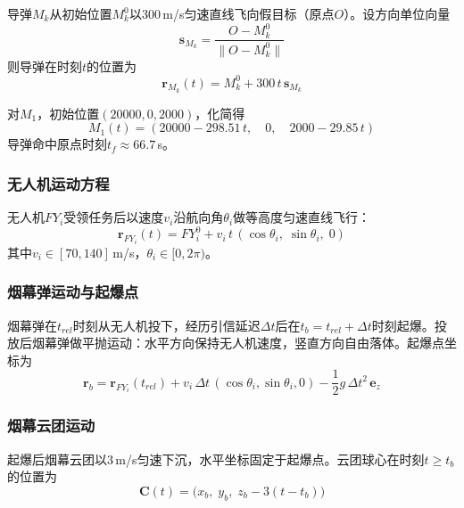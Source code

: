 \documentclass[12pt,a4paper]{article}
\begin{document}
导弹$M_k$从初始位置$M_k^0$以300\,m/s匀速直线飞向假目标（原点$O$）。设方向单位向量
\begin{equation}
\mathbf{s}_{M_k} = \frac{O - M_k^0}{\|O - M_k^0\|}
\end{equation}
则导弹在时刻$t$的位置为
\begin{equation}
\mathbf{r}_{M_k}(t) = M_k^0 + 300 \, t \, \mathbf{s}_{M_k}
\end{equation}

对$M_1$，初始位置$(20000, 0, 2000)$，化简得
\begin{equation}
M_1(t) = (20000 - 298.51\,t, \quad 0, \quad 2000 - 29.85\,t)
\end{equation}
导弹命中原点时刻$t_f \approx 66.7$\,s。

\subsubsection{无人机运动方程}

无人机$FY_i$受领任务后以速度$v_i$沿航向角$\theta_i$做等高度匀速直线飞行：
\begin{equation}
\mathbf{r}_{FY_i}(t) = FY_i^0 + v_i \, t \, (\cos\theta_i, \; \sin\theta_i, \; 0)
\end{equation}
其中$v_i \in [70, 140]$\,m/s，$\theta_i \in [0, 2\pi)$。

\subsubsection{烟幕弹运动与起爆点}

烟幕弹在$t_{rel}$时刻从无人机投下，经历引信延迟$\Delta t$后在$t_b = t_{rel} + \Delta t$时刻起爆。投放后烟幕弹做平抛运动：水平方向保持无人机速度，竖直方向自由落体。起爆点坐标为
\begin{equation}
\mathbf{r}_b = \mathbf{r}_{FY_i}(t_{rel}) + v_i \, \Delta t \, (\cos\theta_i, \sin\theta_i, 0) - \frac{1}{2}g\,\Delta t^2 \, \mathbf{e}_z
\end{equation}

\subsubsection{烟幕云团运动}

起爆后烟幕云团以3\,m/s匀速下沉，水平坐标固定于起爆点。云团球心在时刻$t \geq t_b$的位置为
\begin{equation}
\mathbf{C}(t) = \big(x_b, \; y_b, \; z_b - 3(t - t_b)\big)
\end{equation}
\end{document}
